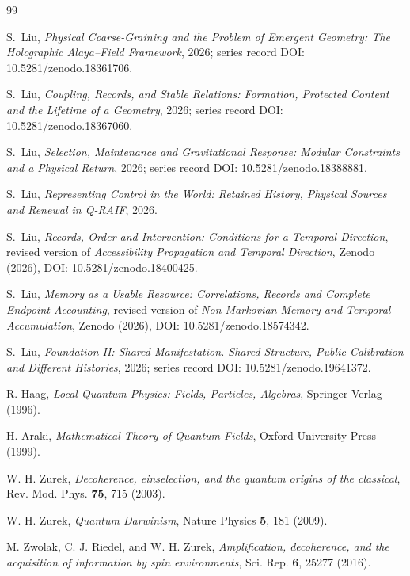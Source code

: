 \documentclass[12pt,a4paper]{article}
\begin{document}
\begin{thebibliography}{99}
\small

S.~Liu, \emph{Physical Coarse-Graining and the Problem of Emergent Geometry: The Holographic Alaya--Field Framework}, 2026; series record DOI: 10.5281/zenodo.18361706.

S.~Liu, \emph{Coupling, Records, and Stable Relations: Formation, Protected Content and the Lifetime of a Geometry}, 2026; series record DOI: 10.5281/zenodo.18367060.

S.~Liu, \emph{Selection, Maintenance and Gravitational Response: Modular Constraints and a Physical Return}, 2026; series record DOI: 10.5281/zenodo.18388881.

S.~Liu, \emph{Representing Control in the World: Retained History, Physical Sources and Renewal in Q-RAIF}, 2026.

S.~Liu, \emph{Records, Order and Intervention: Conditions for a Temporal Direction}, revised version of \emph{Accessibility Propagation and Temporal Direction}, Zenodo (2026), DOI: 10.5281/zenodo.18400425.

S.~Liu, \emph{Memory as a Usable Resource: Correlations, Records and Complete Endpoint Accounting}, revised version of \emph{Non-Markovian Memory and Temporal Accumulation}, Zenodo (2026), DOI: 10.5281/zenodo.18574342.

S.~Liu, \emph{Foundation II: Shared Manifestation. Shared Structure, Public Calibration and Different Histories}, 2026; series record DOI: 10.5281/zenodo.19641372.

R. Haag, \emph{Local Quantum Physics: Fields, Particles, Algebras}, Springer-Verlag (1996).

H. Araki, \emph{Mathematical Theory of Quantum Fields}, Oxford University Press (1999).

W. H. Zurek, \emph{Decoherence, einselection, and the quantum origins of the classical}, Rev. Mod. Phys. \textbf{75}, 715 (2003).

W. H. Zurek, \emph{Quantum Darwinism}, Nature Physics \textbf{5}, 181 (2009).

M. Zwolak, C. J. Riedel, and W. H. Zurek, \emph{Amplification, decoherence, and the acquisition of information by spin environments}, Sci. Rep. \textbf{6}, 25277 (2016).


\end{thebibliography}
\end{document}
